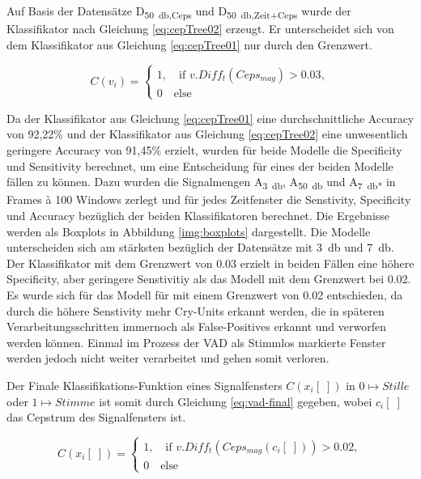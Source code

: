 Auf Basis der Datensätze D\textsubscript{\SI{50}{\decibel},Ceps} und D\textsubscript{\SI{50}{\decibel},Zeit+Ceps} wurde der Klassifikator nach Gleichung \ref{eq:cepTree02} erzeugt. Er unterscheidet sich von dem Klassifikator aus Gleichung \ref{eq:cepTree01} nur durch den Grenzwert.

\begin{equation}
C(v_i) = \begin{cases}
1, \quad \text{if } v.Diff_t(Ceps_{mag}) > 0.03, \\
0 \quad \text{else}
\end{cases}
\label{eq:cepTree02}
\end{equation}

Da der Klassifikator aus Gleichung \ref{eq:cepTree01} eine durchschnittliche Accuracy von 92,22\% und der Klassifikator aus Gleichung \ref{eq:cepTree02} eine unwesentlich geringere Accuracy von 91,45\% erzielt, wurden für beide Modelle die Specificity und Sensitivity berechnet, um eine Entscheidung für eines der beiden Modelle fällen zu können. Dazu wurden die Signalmengen A\textsubscript{\SI{3}{\decibel}}, A\textsubscript{\SI{50}{\decibel}} und A\textsubscript{\SI{7}{\decibel}*} in Frames à 100 Windows zerlegt und für jedes Zeitfenster die Senstivity, Specificity und Accuracy bezüglich der beiden Klassifikatoren berechnet. Die Ergebnisse werden als Boxplots in Abbildung \ref{img:boxplots} dargestellt. Die Modelle unterscheiden sich am stärksten bezüglich der Datensätze mit \SI{3}{\decibel} und \SI{7}{\decibel}. Der Klassifikator mit dem Grenzwert von 0.03 erzielt in beiden Fällen eine höhere Specificity, aber geringere Senstivitiy als das Modell mit dem Grenzwert bei 0.02. Es wurde sich für das Modell für mit einem Grenzwert von 0.02 entschieden, da durch die höhere Senstivity mehr Cry-Units erkannt werden, die in späteren Verarbeitungsschritten immernoch als False-Positives erkannt und verworfen werden können. Einmal im Prozess der VAD als Stimmlos markierte Fenster werden jedoch nicht weiter verarbeitet und gehen somit \glqq verloren\grqq. 

Der Finale Klassifikations-Funktion eines Signalfensters $C(x_i[\;])$ in $0 \longmapsto Stille$ oder $1 \longmapsto Stimme$ ist somit durch Gleichung \ref{eq:vad-final} gegeben, wobei $c_i[\;]$ das Cepstrum des Signalfensters ist.

\begin{equation}
C(x_i[\;]) = \begin{cases}
1, \quad \text{if } v.Diff_t(Ceps_{mag}(c_i[\;])) > 0.02, \\
0 \quad \text{else}
\end{cases}
\label{eq:vad-final}
\end{equation}

